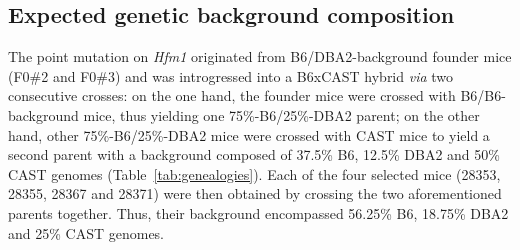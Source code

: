 \subsection{Expected genetic background composition}


The point mutation on \textit{Hfm1} originated from B6/DBA2-background founder mice (F0\#2 and F0\#3) and was introgressed into a B6xCAST hybrid \textit{via} two consecutive crosses: 
on the one hand, the founder mice were crossed with B6/B6-background mice, thus yielding one 75\%-B6/25\%-DBA2 parent;
on the other hand, other 75\%-B6/25\%-DBA2 mice were crossed with CAST mice to yield a second parent with a background composed of 37.5\% B6, 12.5\% DBA2 and 50\% CAST genomes (Table~\ref{tab:genealogies}).
Each of the four selected mice (28353, 28355, 28367 and 28371) were then obtained by crossing the two aforementioned parents together.
Thus, their background encompassed 56.25\% B6, 18.75\% DBA2 and 25\% CAST genomes.



